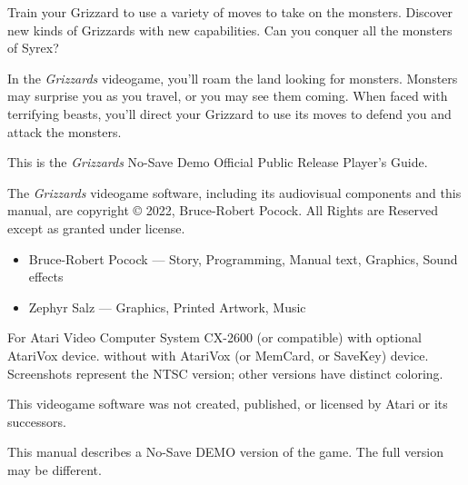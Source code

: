 \documentclass[10pt,twocolumn,openany,article]{memoir}
\begin{document}
\bigskip

Train your Grizzard to  use a variety of moves to  take on the monsters.
Discover new kinds  of Grizzards with new capabilities.  Can you conquer
all the monsters of Syrex?

\bigskip

In the  \textit{Grizzards} videogame, you'll  roam the land  looking for
monsters. Monsters may  surprise you as you travel, or  you may see them
coming. When faced  with terrifying beasts, you'll  direct your Grizzard
to use its moves to defend you and attack the monsters.

\vspace{1in}\vfill

This    is    the     \textit{Grizzards}    \ifdefined\NOSAVE    No-Save
\fi\ifdefined\DEMO Demo \fi\ifdefined\ATARIAGESAVE Official \else Public
Release \fi Player's Guide.

\vspace{12pt}

The  \textit{Grizzards} videogame  software,  including its  audiovisual
components   and  this   manual,   are   copyright  \copyright{}   2022,
Bruce-Robert  Pocock.   All  Rights  are  Reserved   except  as  granted
under license.

\begin{itemize}
\item Bruce-Robert Pocock --- Story, Programming, Manual text, Graphics,
  Sound effects
\item Zephyr Salz --- Graphics, Printed Artwork, Music
\end{itemize}

\bigskip

For   Atari    Video   Computer    System   CX-2600    (or   compatible)
\ifdefined\ATARIAGESAVE   with    optional   AtariVox    device.   \else
\ifdefined\NOSAVE  without  \else  with  \fi AtariVox  (or  MemCard,  or
SaveKey)  device.  \fi Screenshots  represent  the  NTSC version;  other
versions have distinct coloring.

\bigskip

This videogame software was not created, published, or licensed by Atari
or its successors.

\vspace{12pt}

\ifdefined\DEMO
\bigskip

This manual  describes a \ifdefined\NOSAVE  No-Save \fi DEMO  version of
the game. The full version may be different.
\end{document}
